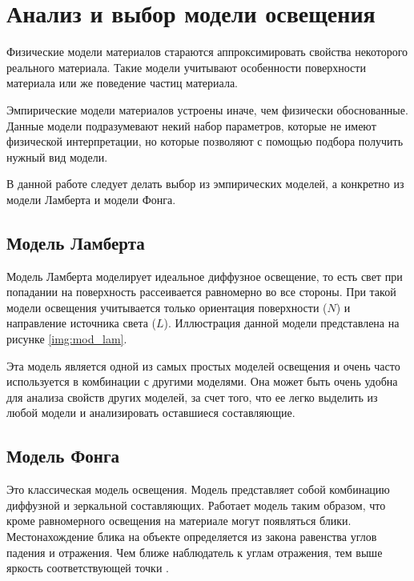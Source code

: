 \section{Анализ и выбор модели освещения}

Физические модели материалов стараются аппроксимировать свойства некоторого реального материала. Такие модели учитывают особенности поверхности материала или же поведение частиц материала.

Эмпирические модели материалов устроены иначе, чем физически обоснованные. Данные модели подразумевают некий набор параметров, которые не имеют физической интерпретации, но которые позволяют с помощью подбора получить нужный вид модели.

В данной работе следует делать выбор из эмпирических моделей, а конкретно из модели Ламберта и модели Фонга.

\subsection{Модель Ламберта}

Модель Ламберта \cite{lamber_fong} моделирует идеальное диффузное освещение, то есть свет при попадании на поверхность рассеивается равномерно во все стороны. При такой модели освещения учитывается только ориентация поверхности ($N$) и направление источника света ($L$). Иллюстрация данной модели представлена на рисунке \ref{img:mod_lam}.


Эта модель является одной из самых простых моделей освещения и очень часто используется в комбинации с другими моделями. Она может быть очень удобна для анализа свойств других моделей, за счет того, что ее легко выделить из любой модели и анализировать оставшиеся составляющие.

\subsection{Модель Фонга}

Это классическая модель освещения. Модель представляет собой комбинацию диффузной и зеркальной составляющих. Работает модель таким образом, что кроме равномерного освещения на материале могут появляться блики. Местонахождение блика на объекте определяется из закона равенства углов падения и отражения. Чем ближе наблюдатель к углам отражения, тем выше яркость соответствующей точки \cite{lamber_fong}.


